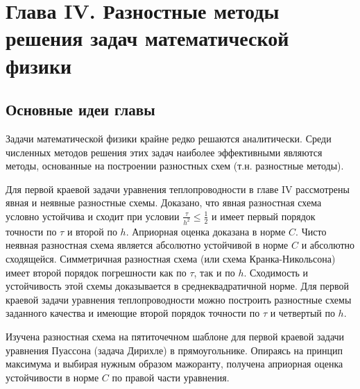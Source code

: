\newpage
{}
\pagestyle{empty}
\vspace{0.5cm}

\section*{Глава IV. Разностные методы решения задач математической физики}

\subsection{Основные идеи главы}

Задачи математической физики крайне редко решаются аналитически. Среди численных методов решения этих задач наиболее эффективными являются методы, основанные на построении разностных схем (т.н. разностные методы).

Для первой краевой задачи уравнения теплопроводности в главе IV рассмотрены явная и неявные разностные схемы. Доказано, что явная разностная схема условно устойчива и сходит при условии \begin{math} \frac{\tau}{h^2} \leq \frac{1}{2} \end{math} и имеет первый порядок точности по $\tau$ и второй по $h$. Априорная оценка доказана в норме $C$. Чисто неявная разностная схема является абсолютно устойчивой в норме $C$ и абсолютно сходящейся. Симметричная разностная схема (или схема Кранка-Никольсона) имеет второй порядок погрешности как по $\tau$, так и по $h$. Сходимость и устойчивость этой схемы доказывается в среднеквадратичной норме. Для первой краевой задачи уравнения теплопроводности можно построить разностные схемы заданного качества и имеющие второй порядок точности по $\tau$ и четвертый по $h$.

Изучена разностная схема на пятиточечном шаблоне для первой краевой задачи уравнения Пуассона (задача Дирихле) в прямоугольнике. Опираясь на принцип максимума и выбирая нужным образом мажоранту, получена априорная оценка устойчивости в норме $C$ по правой части уравнения.

